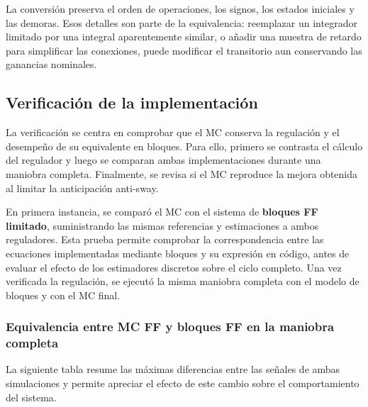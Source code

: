 \documentclass[a4paper,10pt,onecolumn,journal]{ieeeconf}
\numberwithin{equation}{section}
\begin{document}
La conversión preserva el orden de operaciones, los signos, los estados iniciales y las demoras. Esos detalles son parte de la equivalencia: reemplazar un integrador limitado por una integral aparentemente similar, o añadir una muestra de retardo para simplificar las conexiones, puede modificar el transitorio aun conservando las ganancias nominales.


\subsection{Verificación de la implementación}

La verificación se centra en comprobar que el MC conserva la regulación y el desempeño de su equivalente en bloques. Para ello, primero se contrasta el cálculo del regulador y luego se comparan ambas implementaciones durante una maniobra completa. Finalmente, se revisa si el MC reproduce la mejora obtenida al limitar la anticipación anti-sway.

En primera instancia, se comparó el MC con el sistema de \textbf{bloques FF limitado}, suministrando las mismas referencias y estimaciones a ambos reguladores. Esta prueba permite comprobar la correspondencia entre las ecuaciones implementadas mediante bloques y su expresión en código, antes de evaluar el efecto de los estimadores discretos sobre el ciclo completo. Una vez verificada la regulación, se ejecutó la misma maniobra completa con el modelo de bloques y con el MC final.


\subsubsection{Equivalencia entre MC FF y bloques FF en la maniobra completa}

La siguiente tabla resume las máximas diferencias entre las señales de ambas simulaciones y permite apreciar el efecto de este cambio sobre el comportamiento del sistema.
\end{document}
